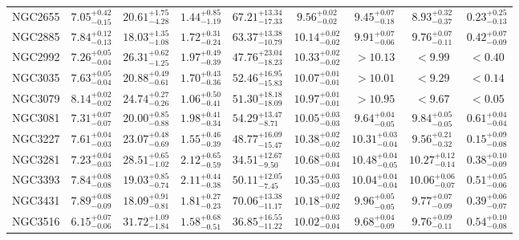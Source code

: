 \documentclass[onecolumn]{mn2e}
\begin{document}
{\begin{center}
\begin{longtable}{lcccccccc}
NGC2655 & $7.05_{-0.15}^{+0.42}$ & $20.61_{-4.28}^{+1.75}$ & $1.44_{-1.19}^{+0.85}$ &$67.21_{-17.33}^{+13.34}$ & $9.56_{-0.02}^{+0.02}$ & $9.45_{-0.18}^{+0.07}$ & $8.93_{-0.37}^{+0.32}$ & $0.23_{-0.13}^{+0.25}$ \\
NGC2885 & $7.84_{-0.13}^{+0.12}$ & $18.03_{-1.08}^{+1.35}$ & $1.72_{-0.24}^{+0.31}$ &$63.37_{-10.79}^{+13.38}$ & $10.14_{-0.02}^{+0.02}$ & $9.91_{-0.06}^{+0.07}$ & $9.76_{-0.11}^{+0.07}$ & $0.42_{-0.09}^{+0.07}$ \\
NGC2992 & $7.26_{-0.04}^{+0.05}$ & $26.31_{-1.25}^{+0.62}$ & $1.97_{-0.39}^{+0.49}$ &$47.76_{-18.23}^{+23.04}$ & $10.33_{-0.02}^{+0.02}$ & $>10.13$ & $<9.99$ & $<0.40$ \\
NGC3035 & $7.63_{-0.04}^{+0.05}$ & $20.88_{-0.61}^{+0.49}$ & $1.70_{-0.36}^{+0.43}$ &$52.46_{-15.83}^{+16.95}$ & $10.07_{-0.01}^{+0.01}$ & $>10.01$ & $<9.29$ & $<0.14$ \\
NGC3079 & $8.14_{-0.02}^{+0.02}$ & $24.74_{-0.26}^{+0.27}$ & $1.06_{-0.41}^{+0.50}$ &$51.30_{-18.09}^{+18.18}$ & $10.97_{-0.01}^{+0.01}$ & $>10.95$ & $<9.67$ & $<0.05$ \\
NGC3081 & $7.31_{-0.07}^{+0.07}$ & $20.00_{-0.88}^{+0.85}$ & $1.98_{-0.34}^{+0.41}$ &$54.29_{-8.71}^{+13.47}$ & $10.05_{-0.03}^{+0.03}$ & $9.64_{-0.05}^{+0.04}$ & $9.84_{-0.05}^{+0.05}$ & $0.61_{-0.04}^{+0.04}$ \\
NGC3227 & $7.61_{-0.03}^{+0.04}$ & $23.07_{-0.69}^{+0.48}$ & $1.55_{-0.39}^{+0.46}$ &$48.77_{-15.47}^{+16.09}$ & $10.38_{-0.02}^{+0.02}$ & $10.31_{-0.04}^{+0.03}$ & $9.56_{-0.32}^{+0.21}$ & $0.15_{-0.08}^{+0.09}$ \\
NGC3281 & $7.23_{-0.03}^{+0.04}$ & $28.51_{-1.02}^{+0.65}$ & $2.12_{-0.59}^{+0.65}$ &$34.51_{-9.50}^{+12.67}$ & $10.68_{-0.04}^{+0.03}$ & $10.48_{-0.05}^{+0.04}$ & $10.27_{-0.14}^{+0.12}$ & $0.38_{-0.09}^{+0.10}$ \\
NGC3393 & $7.84_{-0.08}^{+0.08}$ & $19.03_{-0.74}^{+0.85}$ & $2.11_{-0.38}^{+0.44}$ &$50.11_{-7.45}^{+12.05}$ & $10.35_{-0.03}^{+0.03}$ & $10.04_{-0.04}^{+0.04}$ & $10.06_{-0.07}^{+0.06}$ & $0.51_{-0.06}^{+0.05}$ \\
NGC3431 & $7.89_{-0.09}^{+0.08}$ & $18.09_{-0.81}^{+0.91}$ & $1.81_{-0.23}^{+0.27}$ &$70.06_{-11.17}^{+13.38}$ & $10.18_{-0.02}^{+0.02}$ & $9.96_{-0.05}^{+0.05}$ & $9.77_{-0.09}^{+0.07}$ & $0.39_{-0.07}^{+0.06}$ \\
NGC3516 & $6.15_{-0.06}^{+0.07}$ & $31.72_{-1.84}^{+1.09}$ & $1.58_{-0.51}^{+0.68}$ &$36.85_{-11.22}^{+16.55}$ & $10.02_{-0.04}^{+0.03}$ & $9.68_{-0.09}^{+0.04}$ & $9.76_{-0.11}^{+0.09}$ & $0.54_{-0.08}^{+0.10}$ \\

\end{longtable}
\end{center}}
\end{document}
